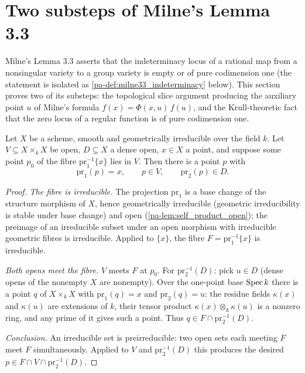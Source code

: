 \section{Two substeps of Milne's Lemma 3.3}
\label{pa-sec:milne33_substeps}

Milne's Lemma 3.3 asserts that the indeterminacy locus of a rational map from a
nonsingular variety to a group variety is empty or of pure codimension one
(the statement is isolated as \ref{pa-def:milne33_indeterminacy} below). This
section proves two of its substeps: the topological slice argument producing
the auxiliary point \(u\) of Milne's formula \(f(x) = \Phi(x,u)\,f(u)\), and
the Krull-theoretic fact that the zero locus of a regular function is of pure
codimension one.

\begin{theorem}
  \label{pa-thm:fibre_slice_witness}
  \leanok

  Let \(X\) be a scheme, smooth and geometrically irreducible over the field
  \(k\). Let \(V \subseteq X \times_k X\) be open, \(D \subseteq X\) a dense
  open, \(x \in X\) a point, and suppose some point \(p_0\) of the fibre
  \(\mathrm{pr}_1^{-1}\{x\}\) lies in \(V\). Then there is a point \(p\) with
  \[
    \mathrm{pr}_1(p) = x, \qquad p \in V, \qquad \mathrm{pr}_2(p) \in D .
  \]
\end{theorem}
\begin{proof}
  \leanok
  \emph{The fibre is irreducible.} The projection \(\mathrm{pr}_1\) is a base
  change of the structure morphism of \(X\), hence geometrically irreducible
  (geometric irreducibility is stable under base change) and open
  (\ref{pa-lem:self_product_open}); the preimage of an irreducible subset under an
  open morphism with irreducible geometric fibres is irreducible. Applied to
  \(\{x\}\), the fibre \(F = \mathrm{pr}_1^{-1}\{x\}\) is irreducible.

  \emph{Both opens meet the fibre.} \(V\) meets \(F\) at \(p_0\). For
  \(\mathrm{pr}_2^{-1}(D)\): pick \(u \in D\) (dense opens of the nonempty
  \(X\) are nonempty). Over the one-point base \(\operatorname{Spec} k\) there is a point
  \(q\) of \(X \times_k X\) with \(\mathrm{pr}_1(q) = x\) and
  \(\mathrm{pr}_2(q) = u\): the residue fields \(\kappa(x)\) and \(\kappa(u)\)
  are extensions of \(k\), their tensor product \(\kappa(x) \otimes_k
  \kappa(u)\) is a nonzero ring, and any prime of it gives such a point. Thus
  \(q \in F \cap \mathrm{pr}_2^{-1}(D)\).

  \emph{Conclusion.} An irreducible set is preirreducible: two open sets each
  meeting \(F\) meet \(F\) simultaneously. Applied to \(V\) and
  \(\mathrm{pr}_2^{-1}(D)\) this produces the desired \(p \in F \cap V \cap
  \mathrm{pr}_2^{-1}(D)\).
\end{proof}

